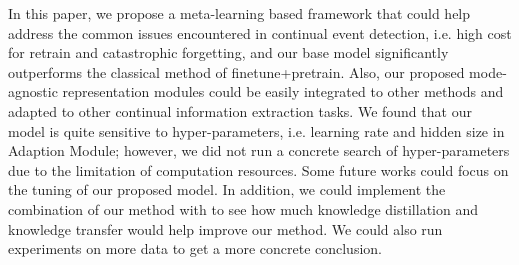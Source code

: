 In this paper, we propose a meta-learning based framework that could help address the common issues encountered in continual event detection, i.e. high cost for retrain and catastrophic forgetting, and our base model significantly outperforms the classical method of finetune+pretrain. Also, our proposed mode-agnostic representation modules could be easily integrated to other methods and adapted to other continual information extraction tasks. We found that our model is quite sensitive to hyper-parameters, i.e. learning rate and hidden size in Adaption Module; however, we did not run a concrete search of hyper-parameters due to the limitation of computation resources. Some future works could focus on the tuning of our proposed model. In addition, we could implement  the combination of our method with \cite{yu2021lifelong}  to see how much knowledge distillation and knowledge transfer would help improve our method. We could also run experiments on more data to get a more concrete conclusion.